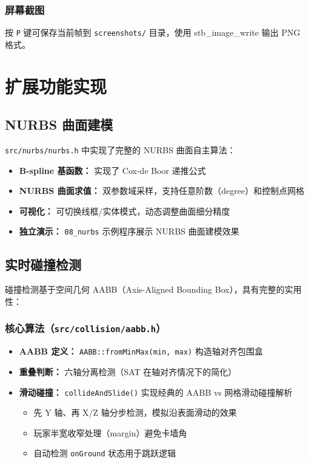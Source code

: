 \documentclass{article}
\begin{document}
\subsubsection{屏幕截图}
按 \texttt{P} 键可保存当前帧到 \texttt{screenshots/} 目录，使用 stb\_image\_write 输出 PNG 格式。

\section{扩展功能实现}

\subsection{NURBS 曲面建模}

\texttt{src/nurbs/nurbs.h} 中实现了完整的 NURBS 曲面自主算法：

\begin{itemize}[nosep]
    \item \textbf{B-spline 基函数：} 实现了 Cox-de Boor 递推公式
    \item \textbf{NURBS 曲面求值：} 双参数域采样，支持任意阶数（degree）和控制点网格
    \item \textbf{可视化：} 可切换线框/实体模式，动态调整曲面细分精度
    \item \textbf{独立演示：} \texttt{08\_nurbs} 示例程序展示 NURBS 曲面建模效果
\end{itemize}

\subsection{实时碰撞检测}
\label{sec:collision}

碰撞检测基于空间几何 AABB（Axis-Aligned Bounding Box），具有完整的实用性：

\subsubsection{核心算法（\texttt{src/collision/aabb.h}）}
\begin{itemize}[nosep]
    \item \textbf{AABB 定义：} \texttt{AABB::fromMinMax(min, max)} 构造轴对齐包围盒
    \item \textbf{重叠判断：} 六轴分离检测（SAT 在轴对齐情况下的简化）
    \item \textbf{滑动碰撞：} \texttt{collideAndSlide()} 实现经典的 AABB vs 网格滑动碰撞解析
          \begin{itemize}
              \item 先 Y 轴、再 X/Z 轴分步检测，模拟沿表面滑动的效果
              \item 玩家半宽收窄处理（margin）避免卡墙角
              \item 自动检测 \texttt{onGround} 状态用于跳跃逻辑
          \end{itemize}
\end{itemize}
\end{document}
